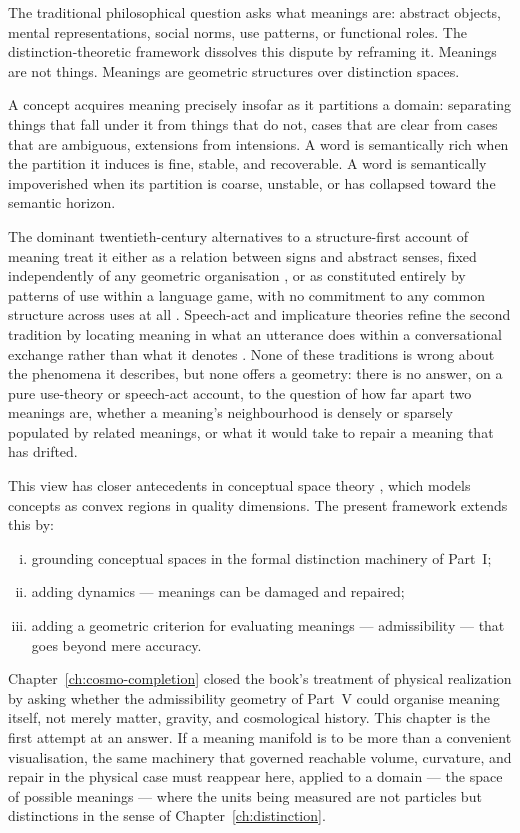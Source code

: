 \documentclass[12pt,twoside,openright]{book}
\begin{document}
The traditional philosophical question asks what meanings
are: abstract objects, mental representations, social
norms, use patterns, or functional roles.
The distinction-theoretic framework dissolves this
dispute by reframing it.
Meanings are not things. Meanings are geometric
structures over distinction spaces.

A concept acquires meaning precisely insofar as it
partitions a domain: separating things that fall under
it from things that do not, cases that are clear from
cases that are ambiguous, extensions from intensions.
A word is semantically rich when the partition it
induces is fine, stable, and recoverable.
A word is semantically impoverished when its partition
is coarse, unstable, or has collapsed toward the
semantic horizon.

The dominant twentieth-century alternatives to a
structure-first account of meaning treat it either as a
relation between signs and abstract senses, fixed
independently of any geometric organisation
\parencite{frege1892}, or as constituted entirely by patterns
of use within a language game, with no commitment to any
common structure across uses at all \parencite{wittgenstein1953}.
Speech-act and implicature theories refine the second
tradition by locating meaning in what an utterance does
within a conversational exchange rather than what it denotes
\parencite{austin1962,grice1975}. None of these traditions is
wrong about the phenomena it describes, but none offers a
geometry: there is no answer, on a pure use-theory or
speech-act account, to the question of how far apart two
meanings are, whether a meaning's neighbourhood is densely or
sparsely populated by related meanings, or what it would take
to repair a meaning that has drifted.

This view has closer antecedents in conceptual space theory
\parencite{gardenfors2000conceptual}, which models
concepts as convex regions in quality dimensions.
The present framework extends this by:
\begin{enumerate}[(i)]
  \item grounding conceptual spaces in the formal
        distinction machinery of Part~I;
  \item adding dynamics — meanings can be damaged and
        repaired;
  \item adding a geometric criterion for evaluating
        meanings — admissibility — that goes beyond
        mere accuracy.
\end{enumerate}

Chapter~\ref{ch:cosmo-completion} closed the book's treatment
of physical realization by asking whether the admissibility
geometry of Part~V could organise meaning itself, not merely
matter, gravity, and cosmological history. This chapter is
the first attempt at an answer. If a meaning manifold is to
be more than a convenient visualisation, the same machinery
that governed reachable volume, curvature, and repair in the
physical case must reappear here, applied to a domain --- the
space of possible meanings --- where the units being measured
are not particles but distinctions in the sense of
Chapter~\ref{ch:distinction}.
\end{document}
